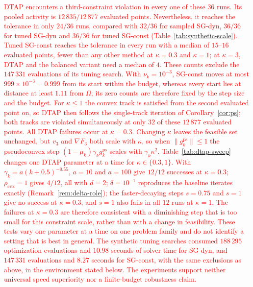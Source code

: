 \documentclass[]{interact}
\theoremstyle{plain}
\theoremstyle{definition}
\theoremstyle{remark}
\newcommand{\cvx}{\mathrm{cvx}}
\newcommand{\ps}{\mathrm{ps}}
\begin{document}
\leavevmode\textcolor{red}{DTAP encounters a third-constraint violation in every one of these $36$
runs. Its pooled activity is $12\,835/12\,877$ evaluated points.
Nevertheless, it reaches the tolerance in only $24/36$ runs, compared
with $32/36$ for sampled SG-dyn, $36/36$ for tuned SG-dyn and $36/36$ for tuned
SG-const (Table~\ref{tab:synthetic-scale}).
Tuned SG-const reaches the tolerance in every run with a median of $15$--$16$
evaluated points, fewer than any other method at $\kappa=0.3$ and $\kappa=1$; at
$\kappa=3$, DTAP and the balanced variant need a median of $4$. These counts
exclude the $147\,331$ evaluations of its tuning search.
With $\nu_k=10^{-3}$, SG-const moves at most $999\times10^{-3}=0.999$ from its start
within the budget, whereas every start lies at distance at least $1.11$ from
$\Omega$; its zero counts are therefore fixed by the step size and the budget.
For $\kappa\le1$ the convex track is satisfied from the second evaluated point on,
so DTAP then follows the single-track iteration of Corollary~\ref{cor:ps}; both tracks are
violated simultaneously at only $32$ of these $12\,877$ evaluated points.
All DTAP failures occur at $\kappa=0.3$. Changing $\kappa$ leaves the feasible set
unchanged, but $v_3$ and $\nabla F_3$ both scale with $\kappa$, so when
$\|g^{\ps}_k\|\le1$ the pseudoconvex step $(1-\mu_k)\gamma_k g^{\ps}_k$ scales with
$\gamma_k\kappa^2$. Table~\ref{tab:dtap-sweep} changes one DTAP parameter at a time
for $\kappa\in\{0.3,1\}$. With $\gamma_k=a(k+0.5)^{-0.55}$, $a=10$ and $a=100$ give
$12/12$ successes at $\kappa=0.3$; $\rho_{\cvx}=1$ gives $4/12$, all with $d=2$;
$\delta=10^{-1}$ reproduces the baseline iterates exactly (Remark~\ref{rem:delta-role}); the
faster-decaying steps $s=0.75$ and $s=1$ give no success at $\kappa=0.3$, and
$s=1$ also fails in all $12$ runs at $\kappa=1$. The failures at $\kappa=0.3$ are
therefore consistent with a diminishing step that is too small for this
constraint scale, rather than with a change in feasibility. These tests vary
one parameter at a time on one problem family and do not identify a setting
that is best in general.
The synthetic tuning searches consumed $188\,295$ optimization evaluations and
$10.98$ seconds of solver time for SG-dyn, and $147\,331$ evaluations and $8.27$
seconds for SG-const, with the same exclusions as above, in the environment
stated below. The experiments support neither
universal speed superiority nor a finite-budget robustness claim.}
\end{document}
